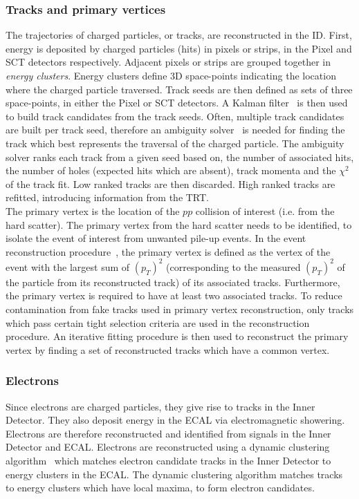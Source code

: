 \subsubsection{Tracks and primary vertices}

The trajectories of charged particles, or tracks, are reconstructed in the ID. First, energy is deposited by charged particles (hits) in pixels or strips, in the Pixel and SCT detectors respectively. Adjacent pixels or strips are grouped together in \textit{energy clusters}. Energy clusters define 3D space-points indicating the location where the charged particle traversed. Track seeds are then defined as sets of three space-points, in either the Pixel or SCT detectors. A Kalman filter~\cite{ASTIER2000138} is then used to build track candidates from the track seeds. Often, multiple track candidates are built per track seed, therefore an ambiguity solver~\cite{Choi:2018mie} is needed for finding the track which best represents the traversal of the charged particle. The ambiguity solver ranks each track from a given seed based on, the number of associated hits, the number of holes (expected hits which are absent), track momenta and the $\chi^{2}$ of the track fit. Low ranked tracks are then discarded. High ranked tracks are refitted, introducing information from the TRT.\\

The primary vertex is the location of the $pp$ collision of interest (i.e. from the hard scatter). The primary vertex from the hard scatter needs to be identified, to isolate the event of interest from unwanted pile-up events. In the event reconstruction procedure~\cite{Meloni_2016}, the primary vertex is defined as the vertex of the event with the largest sum of $(p_{T})^{2}$ (corresponding to the measured $(p_{T})^{2}$ of the particle from its reconstructed track) of its associated tracks. Furthermore, the primary vertex is required to have at least two associated tracks. To reduce contamination from fake tracks used in primary vertex reconstruction, only tracks which pass certain tight selection criteria are used in the reconstruction procedure. An iterative fitting procedure is then used to reconstruct the primary vertex by finding a set of reconstructed tracks which have a common vertex.

\subsubsection{Electrons}
Since electrons are charged particles, they give rise to tracks in the Inner Detector. They also deposit energy in the ECAL via electromagnetic showering. Electrons are therefore reconstructed and identified from signals in the Inner Detector and ECAL. Electrons are reconstructed using a dynamic clustering algorithm~\cite{electronRecoAndID:paper} which matches electron candidate tracks in the Inner Detector to energy clusters in the ECAL. The dynamic clustering algorithm matches tracks to energy clusters which have local maxima, to form electron candidates.

